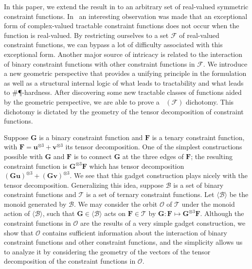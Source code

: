 \documentclass[11pt]{article}
\DeclareMathOperator{\holts}{Holant^*_3}
\newcommand{\teh}{^{\otimes 3}}
\begin{document}
In this paper, we extend the result in
\cite{cai_dichotomy_2013} to an arbitrary
set of real-valued symmetric constraint functions.
In~\cite{liu_restricted_nodate}
an interesting observation was made that an exceptional form of 
complex-valued tractable constraint functions does not occur when the function is 
real-valued.
By restricting ourselves to a set  $\mathcal{F}$ of 
real-valued constraint functions, we can bypass a lot  of difficulty
associated with this exceptional form.
Another major source of intricacy is related to the interaction of binary constraint functions
with other constraint functions in  $\mathcal{F}$.
We introduce a new geometric perspective that provides 
a unifying
principle in the formulation as well as
a structural internal logic of what leads to tractability and what  leads  
to \#\P-hardness. After discovering some new tractable classes of functions
aided by the geometric perspective, we 
are able to prove a $\holts(\mathcal{F})$ dichotomy.
This dichotomy is dictated by the geometry of the tensor decomposition of constraint functions.


Suppose $\mathbf{G}$ is a binary constraint function and $\mathbf{F}$ is a tenary constraint function, with $\mathbf{F} = \mathbf{u}\teh + \mathbf{v}\teh$ its tensor decomposition.
One of the simplest constructions possible with $\mathbf{G}$ and $\mathbf{F}$ is to connect $\mathbf{G}$ at the three edges of $\mathbf{F}$;
the resulting constraint function is $\mathbf{G} \teh \mathbf{F}$ which has tensor decomposition $(\mathbf{G} \mathbf{u})\teh + (\mathbf{G} \mathbf{v})\teh$.
We see that this gadget construction plays nicely with the tensor decomposition.
Generalizing this idea, suppose $\mathcal{B}$ is a set of binary constraint functions and $\mathcal{T}$ is a set of ternary constraint functions.
Let $\langle \mathcal{B} \rangle$ be the monoid generated by $\mathcal{B}$.
We may consider the orbit  $\mathcal{O}$ of $\mathcal{T}$ under the monoid action of $\langle \mathcal{B} \rangle$,
such that $\mathbf{G} \in \langle \mathcal{B} \rangle$ acts on $\mathbf{F} \in \mathcal{T}$ by $\mathbf{G} : \mathbf{F} \mapsto \mathbf{G}\teh \mathbf{F}$.
Although the constraint functions in $\mathcal{O}$ are the results of a very simple gadget construction, we show that $\mathcal{O}$ contains sufficient information about the interaction of  binary constraint functions and  other constraint functions, and the simplicity allows us to analyze it by considering the geometry of the vectors of the tensor decomposition of the constraint functions in $\mathcal{O}$.
\end{document}
